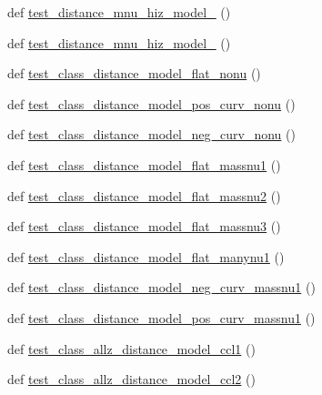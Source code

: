 \begin{DoxyCompactItemize}
def \mbox{\hyperlink{namespaceccl__test__distances_a853da8d0e0c3a2fe0c48452bf4f01cfb}{test\+\_\+distance\+\_\+mnu\+\_\+hiz\+\_\+model\+\_}} ()
\item 
def \mbox{\hyperlink{namespaceccl__test__distances_a2e163314e9fd86da308fcbaec4ed91eb}{test\+\_\+distance\+\_\+mnu\+\_\+hiz\+\_\+model\+\_}} ()
\item 
def \mbox{\hyperlink{namespaceccl__test__distances_abc58e784191f2c4f021f2a5f081a00d0}{test\+\_\+class\+\_\+distance\+\_\+model\+\_\+flat\+\_\+nonu}} ()
\item 
def \mbox{\hyperlink{namespaceccl__test__distances_af7fbdf204412814265e8ac3abdae6d0f}{test\+\_\+class\+\_\+distance\+\_\+model\+\_\+pos\+\_\+curv\+\_\+nonu}} ()
\item 
def \mbox{\hyperlink{namespaceccl__test__distances_a91ae54e6c009701a7847fb4ecc665899}{test\+\_\+class\+\_\+distance\+\_\+model\+\_\+neg\+\_\+curv\+\_\+nonu}} ()
\item 
def \mbox{\hyperlink{namespaceccl__test__distances_aa09eee77252256aad13d6185a05f38d0}{test\+\_\+class\+\_\+distance\+\_\+model\+\_\+flat\+\_\+massnu1}} ()
\item 
def \mbox{\hyperlink{namespaceccl__test__distances_aad241e28f1ff0f6b9db29241f718c89b}{test\+\_\+class\+\_\+distance\+\_\+model\+\_\+flat\+\_\+massnu2}} ()
\item 
def \mbox{\hyperlink{namespaceccl__test__distances_ac0bed567e36c1bf721a6dfe8451359bc}{test\+\_\+class\+\_\+distance\+\_\+model\+\_\+flat\+\_\+massnu3}} ()
\item 
def \mbox{\hyperlink{namespaceccl__test__distances_adf9d1401bd6aac83c599ba6e715e7e5b}{test\+\_\+class\+\_\+distance\+\_\+model\+\_\+flat\+\_\+manynu1}} ()
\item 
def \mbox{\hyperlink{namespaceccl__test__distances_a09a9eb8c340690a269c36ca93ac1bf6f}{test\+\_\+class\+\_\+distance\+\_\+model\+\_\+neg\+\_\+curv\+\_\+massnu1}} ()
\item 
def \mbox{\hyperlink{namespaceccl__test__distances_afa81910489eef8da3b548da81dc23846}{test\+\_\+class\+\_\+distance\+\_\+model\+\_\+pos\+\_\+curv\+\_\+massnu1}} ()
\item 
def \mbox{\hyperlink{namespaceccl__test__distances_a419f62a40098f2bbccbf6c5efe53dc8f}{test\+\_\+class\+\_\+allz\+\_\+distance\+\_\+model\+\_\+ccl1}} ()
\item 
def \mbox{\hyperlink{namespaceccl__test__distances_aa0d96d2b6608404242923827502a6dbd}{test\+\_\+class\+\_\+allz\+\_\+distance\+\_\+model\+\_\+ccl2}} ()
\item 

\end{DoxyCompactItemize}
